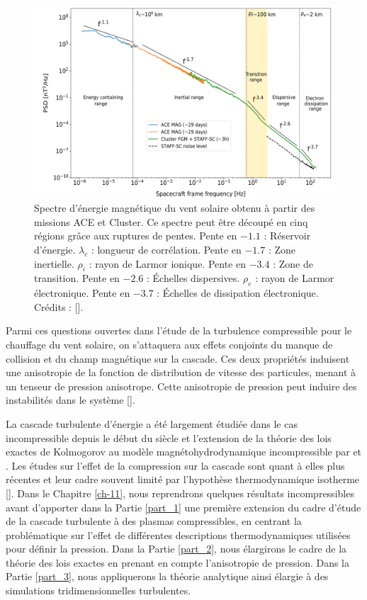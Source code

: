 \begin{figure}[!ht]
 \centering
\includegraphics[width=\linewidth,trim=0.5cm 0cm 0cm 0cm, clip=true]{./Part_0/images/spectre_SW}
\cprotect\caption{Spectre d'énergie magnétique du vent solaire obtenu à partir des missions ACE et Cluster. Ce spectre peut être découpé en cinq régions grâce aux ruptures de pentes. Pente en $-1.1$ : Réservoir d'énergie. $\lambda_c$ : longueur de corrélation. Pente en $-1.7$ : Zone inertielle. $\rho_i$ : rayon de Larmor ionique. Pente en $-3.4$ : Zone de transition. Pente en $-2.6$ : Échelles dispersives. $\rho_e$ : rayon de Larmor électronique. Pente en $-3.7$ : Échelles de dissipation électronique. Crédits : [\cite{sahraoui_magnetohydrodynamic_2020}].}
\label{fig:spectre_SW}
\end{figure}

Parmi ces questions ouvertes dans l'étude de la turbulence compressible pour le chauffage du vent solaire, on s'attaquera aux effets conjoints du manque de collision et du champ magnétique sur la cascade. Ces deux propriétés induisent une anisotropie de la fonction de distribution de vitesse des particules, menant à un tenseur de pression anisotrope. Cette anisotropie de pression peut induire des instabilités dans le système [\cite{parker_dynamical_1958,berezin_firehose_1976,hall_firehose_1981,southwood_mirror_1993,gary_proton_1976,hunana_introductory_2019}]. 

La cascade turbulente d'énergie a été largement étudiée dans le cas incompressible depuis le début du siècle et l'extension de la théorie des lois exactes de Kolmogorov au modèle magnétohydrodynamique incompressible par \cite{politano_von_1998} et \cite{politano_dynamical_1998}. Les études sur l'effet de la compression sur la cascade sont quant à elles plus récentes et leur cadre souvent limité par l'hypothèse thermodynamique isotherme [\cite{marino_scaling_2023}]. Dans le Chapitre \ref{ch-11}, nous reprendrons quelques résultats incompressibles avant d'apporter dans la Partie \ref{part_1} une première extension du cadre d'étude de la cascade turbulente à des plasmas compressibles, en centrant la problématique sur l'effet de différentes descriptions thermodynamiques utilisées pour définir la pression. Dans la Partie \ref{part_2}, nous élargirons le cadre de la théorie des lois exactes en prenant en compte l'anisotropie de pression. Dans la Partie \ref{part_3}, nous appliquerons la théorie analytique ainsi élargie à des simulations tridimensionnelles turbulentes. 


